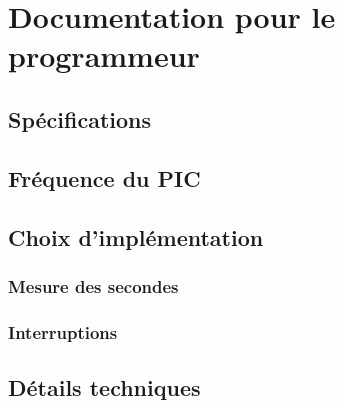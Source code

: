 \documentclass[12pt,a4paper]{article}
\begin{document}
\pagebreak

\section{Documentation pour le programmeur}
    \subsection{Spécifications}
    \subsection{Fréquence du PIC}
    \subsection{Choix d'implémentation}
    \subsubsection{Mesure des secondes}
    \subsubsection{Interruptions}
    \subsection{Détails techniques}
    
\end{document}
